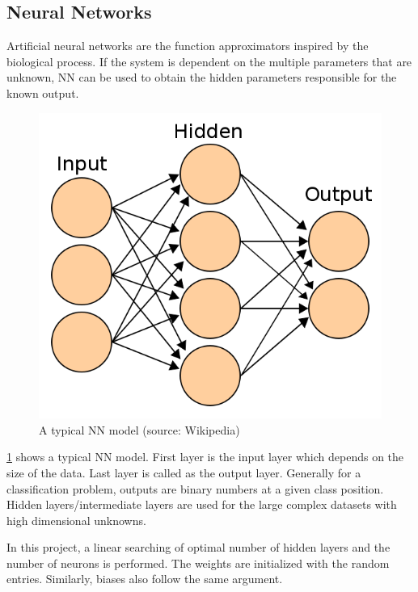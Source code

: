 \documentclass[letterpaper,12pt, onecolumn]{article}%
\begin{document}
\subsection{Neural Networks}
\noindent
Artificial neural networks are the function approximators inspired by the biological process. If the system is dependent on the multiple parameters that are unknown, NN can be used to obtain the hidden parameters responsible for the known output.
\begin{figure}[!hbtp]
 	  \centering
 	   \includegraphics[scale=0.4] {fig_NN.png} 
 	   \caption{A typical NN model (source: Wikipedia) }
       \label{figNNtypical}
\end{figure}
\cref{figNNtypical} shows a typical NN model. First layer is the input layer which depends on the size of the data. Last layer is called as the output layer. Generally for a classification problem, outputs are binary numbers at a given class position. Hidden layers/intermediate layers are used for the large complex datasets with high dimensional unknowns.

In this project, a linear searching of optimal number of hidden layers and the number of neurons is performed. The weights are initialized with the random entries. Similarly, biases also follow the same argument.
\end{document}
